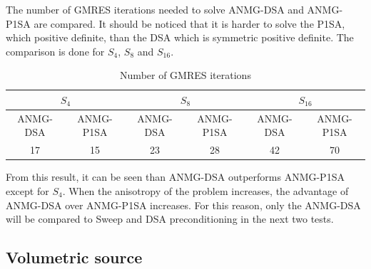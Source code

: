 \documentclass[preprint,10pt]{elsarticle}
\renewcommand{\(}{\left(}
\renewcommand{\)}{\right)}
\renewcommand{\[}{\left[}
\renewcommand{\]}{\right]}
\begin{document}
The number of GMRES iterations needed to solve ANMG-DSA and
ANMG-P1SA are compared. It should be noticed that it is
harder to solve the P1SA, which positive definite, than the DSA which is
symmetric positive definite. The comparison is done for $S_4$, $S_8$ and
$S_{16}$. 
\begin{table}[H]
\begin{center}
\begin{tabular}{|c|c|c|c|c|c|}
\hline
\multicolumn{2}{|c|}{$S_4$} & \multicolumn{2}{c|}{$S_8$} &
\multicolumn{2}{c|}{$S_{16}$}\\
\hline
ANMG-DSA & ANMG-P1SA & ANMG-DSA & ANMG-P1SA & ANMG-DSA & ANMG-P1SA\\
\hline
17 &  15 & 23 & 28 & 42 & 70\\
\hline
\end{tabular}
\caption{Number of GMRES iterations}
\end{center}
\end{table}
From this result, it can be seen than ANMG-DSA outperforms ANMG-P1SA except for
$S_4$. When the anisotropy of the problem increases, the advantage of ANMG-DSA
over ANMG-P1SA increases. For this reason, only the ANMG-DSA will be compared
to Sweep and DSA preconditioning in the next two tests.

\subsection{Volumetric source}
\end{document}
